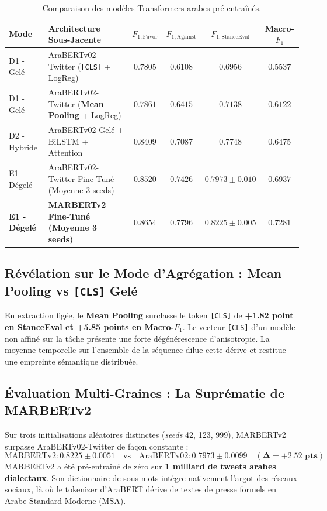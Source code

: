 \documentclass[11pt,a4paper]{article}
\begin{document}
\begin{table}[htbp]
\centering
\caption{Comparaison des modèles Transformers arabes pré-entraînés.}
\label{tab:transformers_eval}
\begin{tabularx}{\textwidth}{llcccc}
\toprule
\textbf{Mode} & \textbf{Architecture Sous-Jacente} & \textbf{$F_{1,\text{Favor}}$} & \textbf{$F_{1,\text{Against}}$} & \textbf{$F_{1,\text{StanceEval}}$} & \textbf{Macro-$F_1$} \\
\midrule
D1 - Gelé & AraBERTv02-Twitter (\texttt{[CLS]} + LogReg) & $0.7805$ & $0.6108$ & $0.6956$ & $0.5537$ \\
D1 - Gelé & AraBERTv02-Twitter (\textbf{Mean Pooling} + LogReg) & $0.7861$ & $0.6415$ & $0.7138$ & $0.6122$ \\
D2 - Hybride & AraBERTv02 Gelé + BiLSTM + Attention & $0.8409$ & $0.7087$ & $0.7748$ & $0.6475$ \\
E1 - Dégelé & AraBERTv02-Twitter Fine-Tuné (Moyenne 3 seeds) & $0.8520$ & $0.7426$ & $0.7973 \pm 0.010$ & $0.6937$ \\
\textbf{E1 - Dégelé} & \textbf{MARBERTv2 Fine-Tuné (Moyenne 3 seeds)} & $\mathbf{0.8654}$ & $\mathbf{0.7796}$ & $\mathbf{0.8225} \pm 0.005$ & $\mathbf{0.7281}$ \\
\bottomrule
\end{tabularx}
\end{table}

\subsection{Révélation sur le Mode d'Agrégation : Mean Pooling vs \texttt{[CLS]} Gelé}
En extraction figée, le \textbf{Mean Pooling} surclasse le token \texttt{[CLS]} de \textbf{+1.82 point en StanceEval et +5.85 points en Macro-$F_1$}. Le vecteur \texttt{[CLS]} d'un modèle non affiné sur la tâche présente une forte dégénérescence d'anisotropie. La moyenne temporelle sur l'ensemble de la séquence dilue cette dérive et restitue une empreinte sémantique distribuée.

\subsection{Évaluation Multi-Graines : La Suprématie de MARBERTv2}
Sur trois initialisations aléatoires distinctes (\textit{seeds} 42, 123, 999), MARBERTv2 surpasse AraBERTv02-Twitter de façon constante :
\begin{equation}
    \text{MARBERTv2} : 0.8225 \pm 0.0051 \quad \text{vs} \quad \text{AraBERTv02} : 0.7973 \pm 0.0099 \quad (\mathbf{\Delta = +2.52\text{ pts}})
\end{equation}
MARBERTv2 a été pré-entraîné de zéro sur \textbf{1 milliard de tweets arabes dialectaux}. Son dictionnaire de sous-mots intègre nativement l'argot des réseaux sociaux, là où le tokenizer d'AraBERT dérive de textes de presse formels en Arabe Standard Moderne (MSA).
\end{document}
